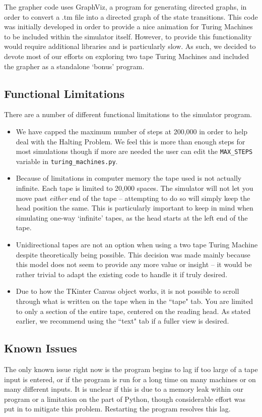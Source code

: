 \documentclass[12pt,letterpaper]{article}
\begin{document}
\noindent The grapher code uses GraphViz, a program for generating directed graphs, in order to convert a .tm file into a directed graph of the state transitions. This code was initially developed in order to provide a nice animation for Turing Machines to be included within the simulator itself. However, to provide this functionality would require additional libraries and is particularly slow. As such, we decided to devote most of our efforts on exploring two tape Turing Machines and included the grapher as a standalone `bonus' program.

\subsection{Functional Limitations}
	\noindent There are a number of different functional limitations to the simulator program. 
	\begin{itemize}
		\item We have capped the maximum number of steps at 200,000 in order to help deal with the Halting Problem. We feel this is more than enough steps for most simulations though if more are needed the user can edit the \texttt{MAX\_STEPS} variable in \texttt{turing\_machines.py}.
		\item Because of limitations in computer memory the tape used is not actually infinite. Each tape is limited to 20,000 spaces. The simulator will not let you move past \textit{either} end of the tape -- attempting to do so will simply keep the head position the same. This is particularly important to keep in mind when simulating one-way `infinite' tapes, as the head starts at the left end of the tape.
		\item Unidirectional tapes are not an option when using a two tape Turing Machine despite theoretically being possible. This decision was made mainly because this model does not seem to provide any more value or insight -- it would be rather trivial to adapt the existing code to handle it if truly desired.
		\item Due to how the TKinter Canvas object works, it is not possible to scroll through what is written on the tape when in the ``tape" tab. You are limited to only a section of the entire tape, centered on the reading head. As stated earlier, we recommend using the ``text" tab if a fuller view is desired.
	\end{itemize}

\subsection{Known Issues}
	\noindent The only known issue right now is the program begins to lag if too large of a tape input is entered, or if the program is run for a long time on many machines or on many different inputs. It is unclear if this is due to a memory leak within our program or a limitation on the part of Python, though considerable effort was put in to mitigate this problem. Restarting the program resolves this lag. 
\newpage
\end{document}
